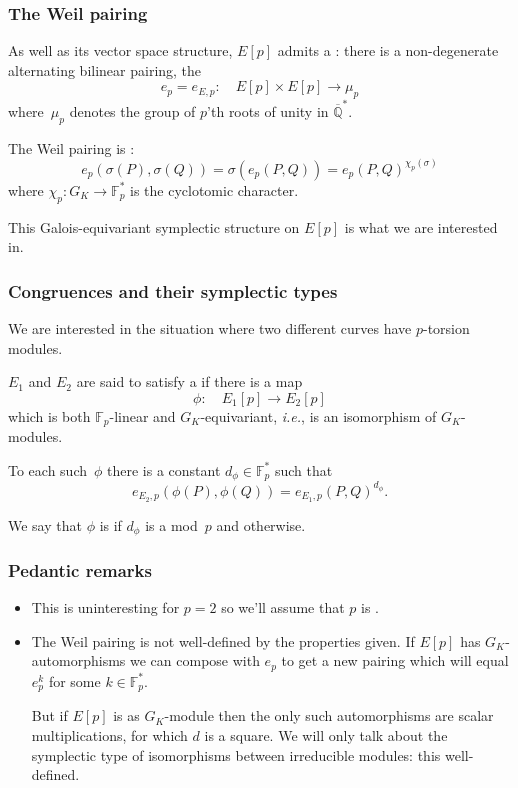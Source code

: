 \documentclass[compress]{beamer}
\newcommand{\Q}{\mathbb Q}
\newcommand{\Qbar}{\overline{\Q}}
\newcommand{\F}{\mathbb F}
\newcommand{\high}[1]{\emph{\color{blue}{#1}}}
\begin{document}
\begin{frame}\frametitle{The Weil pairing}
  As well as its vector space structure, $E[p]$ admits a \high{symplectic
  structure}: there is a non-degenerate alternating bilinear pairing,
  the \high{Weil pairing}
  \[
  e_p = e_{E,p}:\quad E[p]\times E[p] \to \mu_p
  \]
  where~$\mu_p$ denotes the group of $p$'th roots of unity in
  $\Qbar^*$.
  \pause\medskip

  The Weil pairing is \high{Galois equivariant}:
  \[
  e_p(\sigma(P),\sigma(Q)) = \sigma(e_p(P,Q)) = e_p(P,Q)^{\chi_p(\sigma)}
  \]
  where $\chi_p:G_K\to\F_p^*$ is the cyclotomic character.

  \pause\medskip This Galois-equivariant symplectic structure on $E[p]$ is
  what we are interested in.
\end{frame}

\begin{frame}\frametitle{Congruences and their symplectic types}
  We are interested in the situation where two different curves have
  \high{isomorphic} $p$-torsion modules.
  \pause\medskip

  $E_1$ and $E_2$ are said to satisfy a \high{mod~$p$ congruence} if
  there is a map
  \[
  \phi:\quad E_1[p] \to E_2[p]
  \]
  which is both $\F_p$-linear and $G_K$-equivariant, \textit{i.e.}, is
  an isomorphism of $G_K$-modules.
  \pause\medskip

  To each such~$\phi$ there is a constant $d_{\phi}\in\F_p^*$ such
  that
  \[
  e_{E_2,p}(\phi(P),\phi(Q)) = e_{E_1,p}(P,Q)^{d_{\phi}}.
  \]

  We say that $\phi$ is \high{symplectic} if $d_{\phi}$ is a
  \high{square} mod~$p$ and \high{antisymplectic} otherwise.
\end{frame}

\begin{frame}\frametitle{Pedantic remarks}
  \begin{itemize}
    \item This is uninteresting for $p=2$ so we'll assume that $p$ is
      \high{odd}.

    \item The Weil pairing is not well-defined by the properties
      given.  If $E[p]$ has $G_K$-automorphisms we can compose with
      $e_p$ to get a new pairing which will equal $e_p^k$ for some
      $k\in\F_p^*$.

      But if $E[p]$ is \high{irreducible} as
      $G_K$-module then the only such automorphisms are scalar
      multiplications, for which $d$ is a square.  We will only talk
      about the symplectic type of isomorphisms between irreducible
      modules: this \high{is} well-defined.
  \end{itemize}
\end{frame}
\end{document}
